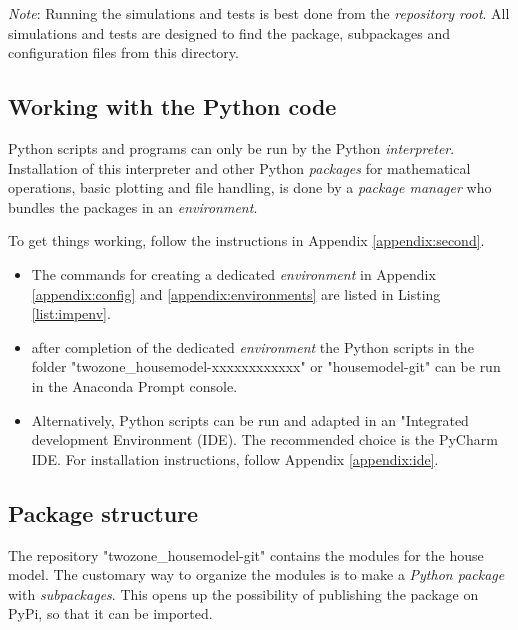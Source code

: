 \textit{Note}: Running the simulations and tests is best done from the \emph{repository root}. All simulations and tests are designed to find the package, subpackages and configuration files from this directory.

\subsection{Working with the Python code}

Python scripts and programs can only be run by the Python \emph{interpreter}. Installation of this interpreter and other Python \emph{packages} for mathematical operations, basic plotting and file handling, is done by a \emph{package manager} who bundles the packages in an \emph{environment}.

To get things working, follow the instructions in Appendix \ref{appendix:second}.

\begin{itemize}
	\item The commands for creating a dedicated \emph{environment} in Appendix \ref{appendix:config} and \ref{appendix:environments} are listed in Listing \ref{list:impenv}.
\end{itemize}



\begin{itemize}
	\item after completion of the dedicated \emph{environment} the Python scripts in the folder "\textsf{twozone\_housemodel-xxxxxxxxxxxx}" or "\textsf{housemodel-git}" can be run in the \textsf{Anaconda Prompt} console.
	\item Alternatively, Python scripts can be run and adapted in an "Integrated development Environment (IDE). The recommended choice is the PyCharm IDE. For installation instructions, follow Appendix \ref{appendix:ide}.
\end{itemize}

\subsection{Package structure}

The repository "\textsf{twozone\_housemodel-git}" contains the modules for the house model. The customary way to organize the modules is to make a \emph{Python package} with \emph{subpackages}. This opens up the possibility of publishing the package on PyPi, so that it can be imported.


